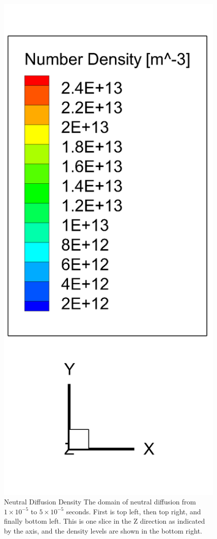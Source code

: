 \begin{figure}
\begin{minipage}[b]{0.2\textwidth}
    \includegraphics[width=\textwidth]{figures/legend.png}
  \end{minipage}
  \caption[Neutral Diffusion Density]{Neutral Diffusion Density \textmd{The domain of neutral diffusion from \(1\times10^{-5}\) to \(5\times10^{-5}\) seconds. First is top left, then top right, and finally bottom left. This is one slice in the Z direction as indicated by the axis, and the density levels are shown in the bottom right.}}
  \label{fig:neutraldiff}
\end{figure}


